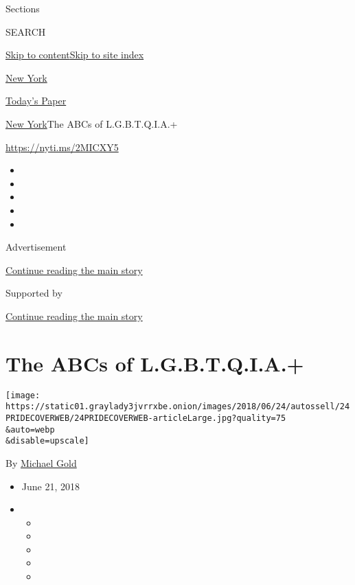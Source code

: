 Sections

SEARCH

\protect\hyperlink{site-content}{Skip to
content}\protect\hyperlink{site-index}{Skip to site index}

\href{https://www.nytimes3xbfgragh.onion/section/nyregion}{New York}

\href{https://myaccount.nytimes3xbfgragh.onion/auth/login?response_type=cookie\&client_id=vi}{}

\href{https://www.nytimes3xbfgragh.onion/section/todayspaper}{Today's
Paper}

\href{/section/nyregion}{New York}\textbar{}The ABCs of L.G.B.T.Q.I.A.+

\url{https://nyti.ms/2MICXY5}

\begin{itemize}
\item
\item
\item
\item
\item
\end{itemize}

Advertisement

\protect\hyperlink{after-top}{Continue reading the main story}

Supported by

\protect\hyperlink{after-sponsor}{Continue reading the main story}

\hypertarget{the-abcs-of-lgbtqia}{%
\section{The ABCs of L.G.B.T.Q.I.A.+}\label{the-abcs-of-lgbtqia}}

\texttt{[image: https://static01.graylady3jvrrxbe.onion/images/2018/06/24/autossell/24PRIDECOVERWEB/24PRIDECOVERWEB-articleLarge.jpg?quality=75\\\&auto=webp\\\&disable=upscale]}

By \href{https://www.nytimes3xbfgragh.onion/by/michael-gold}{Michael
Gold}

\begin{itemize}
\item
  June 21, 2018
\item
  \begin{itemize}
  \item
  \item
  \item
  \item
  \item
  \end{itemize}
\end{itemize}

